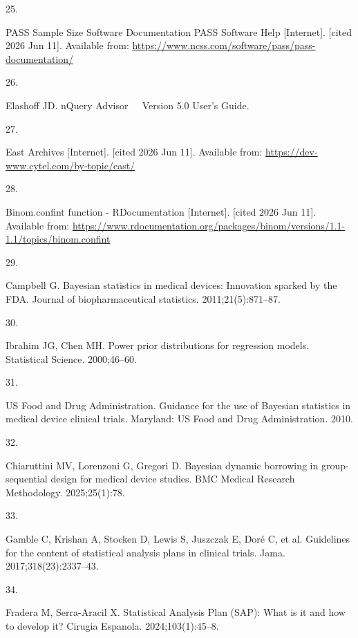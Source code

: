 \documentclass{article}
\newlength{\cslhangindent}
\newlength{\csllabelwidth}
\newenvironment{CSLReferences}[2] %
 {\begin{list}{}{%
  \setlength{\itemindent}{0pt}
  \setlength{\leftmargin}{0pt}
  \setlength{\parsep}{0pt}
  \ifodd #1
   \setlength{\leftmargin}{\cslhangindent}
   \setlength{\itemindent}{-1\cslhangindent}
  \fi
  \setlength{\itemsep}{#2\baselineskip}}}
 {\end{list}}
\newcommand{\CSLLeftMargin}[1]{\parbox[t]{\csllabelwidth}{#1}}
\newcommand{\CSLRightInline}[1]{\parbox[t]{\linewidth - \csllabelwidth}{#1}\break}
\begin{document}
\begin{CSLReferences}{0}{1}
\CSLLeftMargin{25. }%
\CSLRightInline{{PASS} {Sample} {Size} {Software} {Documentation}
{\textbar} {PASS} {Software} {Help} {[}Internet{]}. {[}cited 2026 Jun
11{]}. Available from:
\url{https://www.ncss.com/software/pass/pass-documentation/}}

\CSLLeftMargin{26. }%
\CSLRightInline{Elashoff JD. {nQuery} {Advisor} {Version} 5.0
{User}'s {Guide}.}

\CSLLeftMargin{27. }%
\CSLRightInline{East {Archives} {[}Internet{]}. {[}cited 2026 Jun 11{]}.
Available from: \url{https://dev-www.cytel.com/by-topic/east/}}

\CSLLeftMargin{28. }%
\CSLRightInline{Binom.confint function - {RDocumentation}
{[}Internet{]}. {[}cited 2026 Jun 11{]}. Available from:
\url{https://www.rdocumentation.org/packages/binom/versions/1.1-1.1/topics/binom.confint}}

\CSLLeftMargin{29. }%
\CSLRightInline{Campbell G. Bayesian statistics in medical devices:
Innovation sparked by the {FDA}. Journal of biopharmaceutical
statistics. 2011;21(5):871--87.}

\CSLLeftMargin{30. }%
\CSLRightInline{Ibrahim JG, Chen MH. Power prior distributions for
regression models. Statistical Science. 2000;46--60.}

\CSLLeftMargin{31. }%
\CSLRightInline{US Food and Drug Administration. Guidance for the use of
{Bayesian} statistics in medical device clinical trials. Maryland: US
Food and Drug Administration. 2010.}

\CSLLeftMargin{32. }%
\CSLRightInline{Chiaruttini MV, Lorenzoni G, Gregori D. Bayesian dynamic
borrowing in group-sequential design for medical device studies. BMC
Medical Research Methodology. 2025;25(1):78.}

\CSLLeftMargin{33. }%
\CSLRightInline{Gamble C, Krishan A, Stocken D, Lewis S, Juszczak E,
Doré C, et al. Guidelines for the content of statistical analysis plans
in clinical trials. Jama. 2017;318(23):2337--43.}

\CSLLeftMargin{34. }%
\CSLRightInline{Fradera M, Serra-Aracil X. Statistical {Analysis} {Plan}
({SAP}): {What} is it and how to develop it? Cirugia Espanola.
2024;103(1):45--8.}


\end{CSLReferences}
\end{document}
